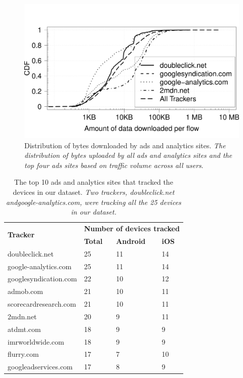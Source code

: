 \begin{figure}[t]
\includegraphics[width=\columnwidth]{plots/distrib_ad_downloads.pdf}
\caption{Distribution of bytes downloaded by ads and analytics sites. \emph{The distribution of bytes uploaded by all ads and analytics sites and the top four ads sites based on traffic volume across all users}.}
\label{fig:description}
\end{figure}

\begin{table}[t]
\centering
\begin{small}
\begin{tabular}{|p{}|p{}|p{}|p{}|}
\hline
\multirow{2}{*}{\bf Tracker} & \multicolumn{3}{c|}{\bf Number of devices tracked}\tabularnewline
\cline{2-4}
   &  {\bf Total} & {\bf Android} & {\bf iOS} \tabularnewline
\hline
doubleclick.net & 25 & 11 & 14 \tabularnewline
\hline
google-analytics.com   & 25 & 11 & 14 \tabularnewline
\hline
googlesyndication.com  & 22 & 10 & 12 \tabularnewline
\hline
admob.com  & 21 & 10 & 11 \tabularnewline
\hline
scorecardresearch.com &  21 & 10 & 11 \tabularnewline
\hline
2mdn.net  &  20 & 9 &  11 \tabularnewline
\hline
atdmt.com  & 18 & 9 &  9 \tabularnewline
\hline
imrworldwide.com & 18 &  9 &  9 \tabularnewline
\hline
flurry.com & 17 & 7 &  10 \tabularnewline
\hline
googleadservices.com  & 17 & 8 &  9 \tabularnewline
\hline
\end{tabular}
\end{small}
\caption{The top 10 ads and analytics sites that tracked the devices in our dataset.
\emph{Two trackers, \emph{doubleclick.net} and\emph{google-analytics.com}, were tracking all the 25 devices in our dataset.}}
\label{tab:top_trackers}
\end{table}


